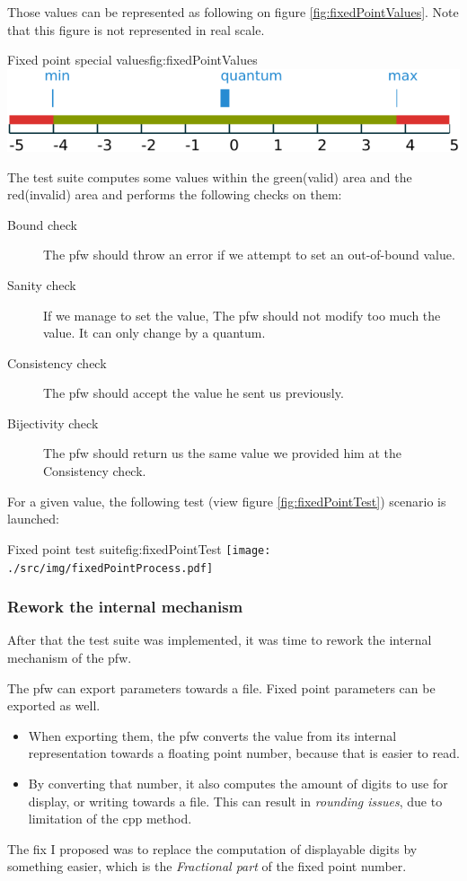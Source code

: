 Those values can be represented as following on figure \ref{fig:fixedPointValues}. Note that
this figure is not represented in real scale.
\begin{figureGraphics}{Fixed point special values}{fig:fixedPointValues}
    \includegraphics[width=\textwidth]{./src/img/fixedPoint.pdf}
\end{figureGraphics}


The test suite computes some values within the green(valid) area and the
red(invalid) area and performs the following checks on them:
\begin{description}
    \item[Bound check] The \gls{pfw} should throw an error if we
        attempt to set an out-of-bound value.
    \item[Sanity check] If we manage to set the value, The \gls{pfw} should not modify too much
        the value. It can only change by a quantum.
    \item[Consistency check] The \gls{pfw} should accept the value he sent us previously.
    \item[Bijectivity check] The \gls{pfw} should return us the same value we provided him at the Consistency check.
\end{description}

For a given value, the following test (view figure \ref{fig:fixedPointTest}) scenario is launched:
\begin{figureGraphics}{Fixed point test suite}{fig:fixedPointTest}
    \texttt{[image: ./src/img/fixedPointProcess.pdf]}
\end{figureGraphics}

\subsubsection{Rework the internal mechanism}
After that the test suite was implemented, it was time to rework the internal
mechanism of the \gls{pfw}.

The \gls{pfw} can export parameters towards a file. Fixed
point parameters can be exported as well.
\begin{itemize}
    \item When exporting them, the \gls{pfw} converts the value from
        its internal representation towards a floating point number, because that is
        easier to read.
    \item By converting that number, it also computes the amount of digits
        to use for display, or writing towards a file. This can result in
        \emph{rounding issues}, due to limitation of the \gls{cpp} method.
\end{itemize}
The fix I proposed was to replace the computation of displayable digits by something
easier, which is the \emph{Fractional part} of the fixed point number.

